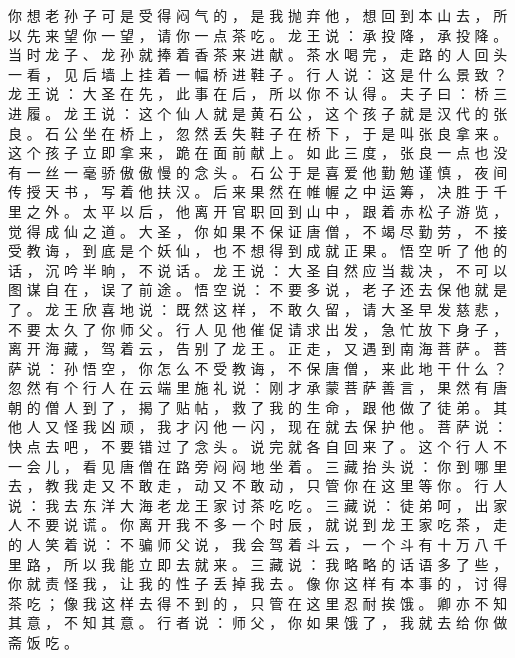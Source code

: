 {你 想 老 孙 子 可 是 受 得 闷 气 的 ， 是 我 抛 弃 他 ， 想 回 到 本 山 去 ， 所 以 先 来 望 你 一 望 ， 请 你 一 点 茶 吃 。
龙 王 说 ： 承 投 降 ， 承 投 降 。
当 时 龙 子 、 龙 孙 就 捧 着 香 茶 来 进 献 。
茶 水 喝 完 ， 走 路 的 人 回 头 一 看 ， 见 后 墙 上 挂 着 一 幅 桥 进 鞋 子 。
行 人 说 ： 这 是 什 么 景 致 ？ 龙 王 说 ： 大 圣 在 先 ， 此 事 在 后 ， 所 以 你 不 认 得 。
夫 子 曰 ： 桥 三 进 履 。
龙 王 说 ： 这 个 仙 人 就 是 黄 石 公 ， 这 个 孩 子 就 是 汉 代 的 张 良 。 石 公 坐 在 桥 上 ， 忽 然 丢 失 鞋 子 在 桥 下 ， 于 是 叫 张 良 拿 来 。
这 个 孩 子 立 即 拿 来 ， 跪 在 面 前 献 上 。
如 此 三 度 ， 张 良 一 点 也 没 有 一 丝 一 毫 骄 傲 傲 慢 的 念 头 。 石 公 于 是 喜 爱 他 勤 勉 谨 慎 ， 夜 间 传 授 天 书 ， 写 着 他 扶 汉 。
后 来 果 然 在 帷 幄 之 中 运 筹 ， 决 胜 于 千 里 之 外 。
太 平 以 后 ， 他 离 开 官 职 回 到 山 中 ， 跟 着 赤 松 子 游 览 ， 觉 得 成 仙 之 道 。
大 圣 ， 你 如 果 不 保 证 唐 僧 ， 不 竭 尽 勤 劳 ， 不 接 受 教 诲 ， 到 底 是 个 妖 仙 ， 也 不 想 得 到 成 就 正 果 。
悟 空 听 了 他 的 话 ， 沉 吟 半 晌 ， 不 说 话 。
龙 王 说 ： 大 圣 自 然 应 当 裁 决 ， 不 可 以 图 谋 自 在 ， 误 了 前 途 。
悟 空 说 ： 不 要 多 说 ， 老 子 还 去 保 他 就 是 了 。
龙 王 欣 喜 地 说 ： 既 然 这 样 ， 不 敢 久 留 ， 请 大 圣 早 发 慈 悲 ， 不 要 太 久 了 你 师 父 。
行 人 见 他 催 促 请 求 出 发 ， 急 忙 放 下 身 子 ， 离 开 海 藏 ， 驾 着 云 ， 告 别 了 龙 王 。
正 走 ， 又 遇 到 南 海 菩 萨 。
菩 萨 说 ： 孙 悟 空 ， 你 怎 么 不 受 教 诲 ， 不 保 唐 僧 ， 来 此 地 干 什 么 ？ 忽 然 有 个 行 人 在 云 端 里 施 礼 说 ： 刚 才 承 蒙 菩 萨 善 言 ， 果 然 有 唐 朝 的 僧 人 到 了 ， 揭 了 贴 帖 ， 救 了 我 的 生 命 ， 跟 他 做 了 徒 弟 。
其 他 人 又 怪 我 凶 顽 ， 我 才 闪 他 一 闪 ， 现 在 就 去 保 护 他 。
菩 萨 说 ： 快 点 去 吧 ， 不 要 错 过 了 念 头 。
说 完 就 各 自 回 来 了 。
这 个 行 人 不 一 会 儿 ， 看 见 唐 僧 在 路 旁 闷 闷 地 坐 着 。
三 藏 抬 头 说 ： 你 到 哪 里 去 ， 教 我 走 又 不 敢 走 ， 动 又 不 敢 动 ， 只 管 你 在 这 里 等 你 。
行 人 说 ： 我 去 东 洋 大 海 老 龙 王 家 讨 茶 吃 吃 。
三 藏 说 ： 徒 弟 呵 ， 出 家 人 不 要 说 谎 。
你 离 开 我 不 多 一 个 时 辰 ， 就 说 到 龙 王 家 吃 茶 ， 走 的 人 笑 着 说 ： 不 骗 师 父 说 ， 我 会 驾 着 斗 云 ， 一 个 斗 有 十 万 八 千 里 路 ， 所 以 我 能 立 即 去 就 来 。
三 藏 说 ： 我 略 略 的 话 语 多 了 些 ， 你 就 责 怪 我 ， 让 我 的 性 子 丢 掉 我 去 。
像 你 这 样 有 本 事 的 ， 讨 得 茶 吃 ； 像 我 这 样 去 得 不 到 的 ， 只 管 在 这 里 忍 耐 挨 饿 。
卿 亦 不 知 其 意 ， 不 知 其 意 。
行 者 说 ： 师 父 ， 你 如 果 饿 了 ， 我 就 去 给 你 做 斋 饭 吃 。
}
